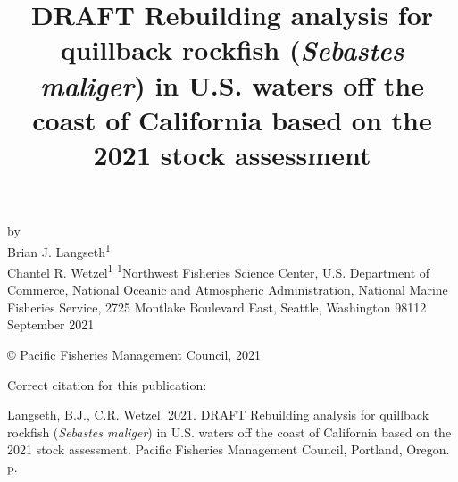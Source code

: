 \documentclass[11pt,
  english,
  a4paper,
]{article}
\date{}
\newcommand{\trTitle}{DRAFT Rebuilding analysis for quillback rockfish (\emph{Sebastes maliger}) in U.S. waters off the coast of California based on the 2021 stock assessment}
\newcommand{\trYear}{2021}
\newcommand{\trMonth}{September}
\newcommand{\trAuthsBack}{Langseth, B.J., C.R. Wetzel}
\newcommand{\trCitation}{
\begin{hangparas}{1em}{1}
\trAuthsBack{}. \trYear{}. \trTitle{}. Pacific Fisheries Management Council, Portland, Oregon. \pageref{LastPage}{}\,p.
\end{hangparas}}
\begin{document}

\renewcommand*{\thefootnote}{\fnsymbol{footnote}}

\small
\thispagestyle{empty}
\noindent
\begin{center}
\title{DRAFT Rebuilding analysis for quillback rockfish (\emph{Sebastes maliger}) in U.S. waters off the coast of California based on the 2021 stock assessment}
\vspace{1.5cm}
{\Large\textbf{}}
\vfill
by\\
Brian J. Langseth\textsuperscript{1}\\
Chantel R. Wetzel\textsuperscript{1}\vfill
\textsuperscript{1}Northwest Fisheries Science Center, U.S. Department of Commerce, National Oceanic and Atmospheric Administration, National Marine Fisheries Service, 2725 Montlake Boulevard East, Seattle, Washington 98112\vfill
\trMonth{} \trYear{}
\end{center}
\clearpage

\thispagestyle{empty}
\vspace*{\fill}
\begin{center}
\copyright{} Pacific Fisheries Management Council, \trYear{}\\
\end{center}
\par
\bigskip
\noindent
Correct citation for this publication:
\bigskip
\par
\trCitation{}
\clearpage


\tableofcontents\clearpage
\label{TRlastRoman}
\clearpage

\newpage
\thispagestyle{empty} %

\pagestyle{plain}  %
\renewcommand*{\thefootnote}{\arabic{footnote}}  %
\setcounter{footnote}{0}  %
\renewcommand{\headrulewidth}{0.5pt}
\renewcommand{\footrulewidth}{0.5pt}
\end{document}
